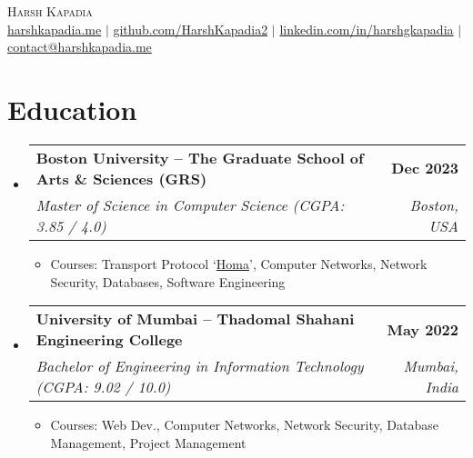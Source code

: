 \documentclass[letterpaper,11pt]{article}
\makeatletter
\newcommand{\resumeItem}[1]{
  \item\small{
    {#1 \vspace{-2pt}}
  }
}
\newcommand{\resumeSubheading}[4]{
  \vspace{-2pt}\item
    \begin{tabular*}{1.0\textwidth}[t]{l@{\extracolsep{\fill}}r}
      \vspace{-2pt}\textbf{#1} & \textbf{\small #2} \\
      \textit{\small#3} & \textit{\small #4} \\
    \end{tabular*}\vspace{-7pt}
}
\newcommand{\resumeSubHeadingListStart}{\begin{itemize}[leftmargin=0.0in, label={}]}
\newcommand{\resumeSubHeadingListEnd}{\end{itemize}}
\newcommand{\resumeItemListStart}{\begin{itemize}}
\newcommand{\resumeItemListEnd}{\end{itemize}\vspace{-5pt}}
\makeatother
\begin{document}

\begin{center}
    {\huge \scshape Harsh Kapadia} \\ \vspace{5pt}
    \small
    \href{https://harshkapadia.me}{harshkapadia.me} $|$ \href{https://github.com/HarshKapadia2}{github.com/HarshKapadia2} $|$ \href{https://linkedin.com/in/harshgkapadia}{linkedin.com/in/harshgkapadia} $|$ \href{mailto:contact@harshkapadia.me}{contact@harshkapadia.me}
    \vspace{-8pt}
\end{center}


\section{Education}
    \resumeSubHeadingListStart
        \resumeSubheading
            {Boston University -- The Graduate School of Arts \& Sciences (GRS)}{Dec 2023}
            {Master of Science in Computer Science (CGPA: 3.85 / 4.0)}{Boston, USA}
            \resumeItemListStart
                \resumeItem{Courses: Transport Protocol `\href{https://networking.harshkapadia.me/files/homa/report}{Homa}', Computer Networks, Network Security, Databases, Software Engineering}
            \resumeItemListEnd

        \resumeSubheading
            {University of Mumbai -- Thadomal Shahani Engineering College}{May 2022}
            {Bachelor of Engineering in Information Technology (CGPA: 9.02 / 10.0)}{Mumbai, India}
            \resumeItemListStart
                \resumeItem{Courses: Web Dev., Computer Networks, Network Security, Database Management, Project Management}
            \resumeItemListEnd
    \resumeSubHeadingListEnd
\vspace{-19pt}


\end{document}
